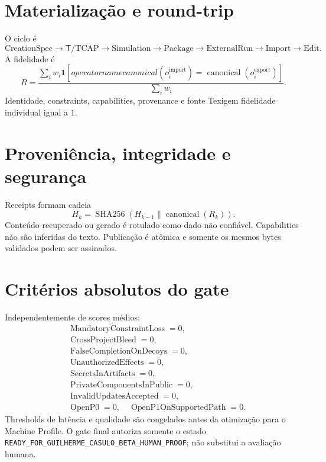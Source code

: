 \documentclass[10pt,a4paper]{article}
\newcommand{\Tlang}{\textsf{T}}
\begin{document}
\section{Materialização e round-trip}

O ciclo é
\begin{equation}
\mathrm{CreationSpec}\to\Tlang/\mathrm{TCAP}\to
\mathrm{Simulation}\to\mathrm{Package}\to\mathrm{ExternalRun}
\to\mathrm{Import}\to\mathrm{Edit}.
\end{equation}
A fidelidade é
\begin{equation}
R=\frac{\sum_iw_i\mathbf1[operatorname{canonical}(o_i^{\mathrm{import}})
=\operatorname{canonical}(o_i^{\mathrm{export}})]}{\sum_iw_i}.
\end{equation}
Identidade, constraints, capabilities, provenance e fonte \Tlang exigem
fidelidade individual igual a $1$.

\section{Proveniência, integridade e segurança}

Receipts formam cadeia
\begin{equation}
H_k=\operatorname{SHA256}(H_{k-1}\parallel
\operatorname{canonical}(R_k)).
\end{equation}
Conteúdo recuperado ou gerado é rotulado como dado não confiável. Capabilities
não são inferidas do texto. Publicação é atômica e somente os mesmos bytes
validados podem ser assinados.

\section{Critérios absolutos do gate}

Independentemente de scores médios:
\begin{align*}
&\operatorname{MandatoryConstraintLoss}=0,\\
&\operatorname{CrossProjectBleed}=0,\\
&\operatorname{FalseCompletionOnDecoys}=0,\\
&\operatorname{UnauthorizedEffects}=0,\\
&\operatorname{SecretsInArtifacts}=0,\\
&\operatorname{PrivateComponentsInPublic}=0,\\
&\operatorname{InvalidUpdatesAccepted}=0,\\
&\operatorname{OpenP0}=0,\quad
\operatorname{OpenP1OnSupportedPath}=0.
\end{align*}
Thresholds de latência e qualidade são congelados antes da otimização para o
Machine Profile. O gate final autoriza somente o estado
\texttt{READY\_FOR\_GUILHERME\_CASULO\_BETA\_HUMAN\_PROOF}; não substitui a
avaliação humana.
\end{document}

